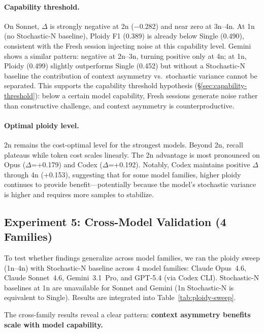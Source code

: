 \documentclass[11pt]{article}
\begin{document}
\paragraph{Capability threshold.} On Sonnet, $\Delta$ is strongly negative at 2n ($-$0.282) and near zero at 3n--4n. At 1n (no Stochastic-N baseline), Ploidy F1 (0.389) is already below Single (0.490), consistent with the Fresh session injecting noise at this capability level. Gemini shows a similar pattern: negative at 2n--3n, turning positive only at 4n; at 1n, Ploidy (0.499) slightly outperforms Single (0.452) but without a Stochastic-N baseline the contribution of context asymmetry vs.\ stochastic variance cannot be separated. This supports the capability threshold hypothesis (\S\ref{sec:capability-threshold}): below a certain model capability, Fresh sessions generate noise rather than constructive challenge, and context asymmetry is counterproductive.

\paragraph{Optimal ploidy level.} 2n remains the cost-optimal level for the strongest models. Beyond 2n, recall plateaus while token cost scales linearly. The 2n advantage is most pronounced on Opus ($\Delta$=+0.179) and Codex ($\Delta$=+0.192). Notably, Codex maintains positive $\Delta$ through 4n (+0.153), suggesting that for some model families, higher ploidy continues to provide benefit---potentially because the model's stochastic variance is higher and requires more samples to stabilize.

\subsection{Experiment 5: Cross-Model Validation (4 Families)}
\label{sec:cross-model}

To test whether findings generalize across model families, we ran the ploidy sweep (1n--4n) with Stochastic-N baseline across 4 model families: Claude Opus~4.6, Claude Sonnet~4.6, Gemini~3.1~Pro, and GPT-5.4 (via Codex CLI). Stochastic-N baselines at 1n are unavailable for Sonnet and Gemini (1n Stochastic-N is equivalent to Single). Results are integrated into Table~\ref{tab:ploidy-sweep}.

The cross-family results reveal a clear pattern: \textbf{context asymmetry benefits scale with model capability.}
\end{document}
